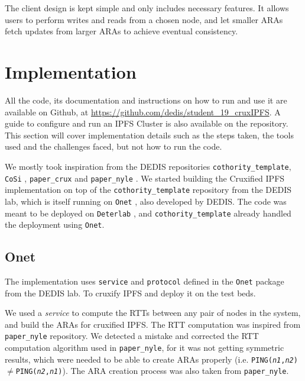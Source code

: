 \documentclass[a4paper,11pt,oneside]{report}
\begin{document}
The client design is kept simple and only includes necessary features. It allows users to perform writes and reads from a chosen node, and let smaller ARAs fetch updates from larger ARAs to achieve eventual consistency.

\section{Implementation}

All the code, its documentation and instructions on how to run and use it are available on Github, at \url{https://github.com/dedis/student_19_cruxIPFS}. A guide to configure and run an IPFS Cluster is also available on the repository. This section will cover implementation details such as the steps taken, the tools used and the challenges faced, but not how to run the code.

We mostly took inspiration from the DEDIS repositories \texttt{cothority\_template}\cite{cothority_template}, \texttt{CoSi} \cite{CoSi}, \texttt{paper\_crux} \cite{paper_crux} and 
\texttt{paper\_nyle} \cite{paper_nyle}. 
We started building the Cruxified IPFS implementation on top of the \texttt{cothority\_template} repository from the DEDIS lab, which is itself running on \texttt{Onet} \cite{onet}, also developed by DEDIS. The code was meant to be deployed on \texttt{Deterlab} \cite{deterlab}, and \texttt{cothority\_template} already handled the deployment using \texttt{Onet}.

\subsection{Onet}

The implementation uses \texttt{service} and \texttt{protocol} defined in the \texttt{Onet} package from the DEDIS lab. To cruxify IPFS and deploy it on the test beds.

We used a \textit{service} to compute the RTTs between any pair of nodes in the system, and build the ARAs for cruxified IPFS. The RTT computation was inspired from \texttt{paper\_nyle} repository. We detected a mistake and corrected the RTT computation algorithm used in \texttt{paper\_nyle}, for it was not getting symmetric results, which were needed to be able to create ARAs properly (i.e. \texttt{PING(\textit{n1},\textit{n2})}$\neq$\texttt{PING(\textit{n2},\textit{n1})}). The ARA creation process was also taken from \texttt{paper\_nyle}.
\end{document}
